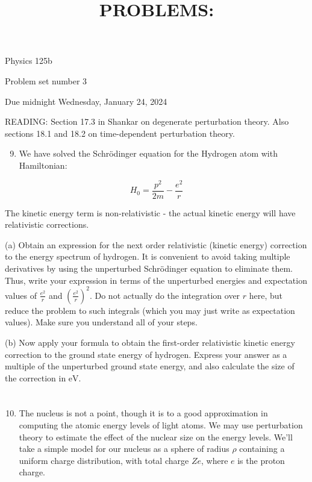 \documentclass[12pt]{article}
\title{PROBLEMS: }
\author{}
\date{}
\begin{document}
\maketitle
Physics 125b

Problem set number 3

Due midnight Wednesday, January 24, 2024

READING: Section 17.3 in Shankar on degenerate perturbation theory. Also sections 18.1 and 18.2 on time-dependent perturbation theory.

\begin{enumerate}
  \setcounter{enumi}{8}
  \item We have solved the Schrödinger equation for the Hydrogen atom with Hamiltonian:
\end{enumerate}

$$
H_{0}=\frac{p^{2}}{2 m}-\frac{e^{2}}{r}
$$

The kinetic energy term is non-relativistic - the actual kinetic energy will have relativistic corrections.

(a) Obtain an expression for the next order relativistic (kinetic energy) correction to the energy spectrum of hydrogen. It is convenient to avoid taking multiple derivatives by using the unperturbed Schrödinger equation to eliminate them. Thus, write your expression in terms of the unperturbed energies and expectation values of $\frac{e^{2}}{r}$ and $\left(\frac{e^{2}}{r}\right)^{2}$. Do not actually do the integration over $r$ here, but reduce the problem to such integrals (which you may just write as expectation values). Make sure you understand all of your steps.

(b) Now apply your formula to obtain the first-order relativistic kinetic energy correction to the ground state energy of hydrogen. Express your answer as a multiple of the unperturbed ground state energy, and also calculate the size of the correction in $\mathrm{eV}$.
\section{}
\begin{enumerate}
  \setcounter{enumi}{9}
  \item The nucleus is not a point, though it is to a good approximation in computing the atomic energy levels of light atoms. We may use perturbation theory to estimate the effect of the nuclear size on the energy levels. We'll take a simple model for our nucleus as a sphere of radius $\rho$ containing a uniform charge distribution, with total charge $Z e$, where $e$ is the proton charge.
\end{enumerate}
\end{document}
